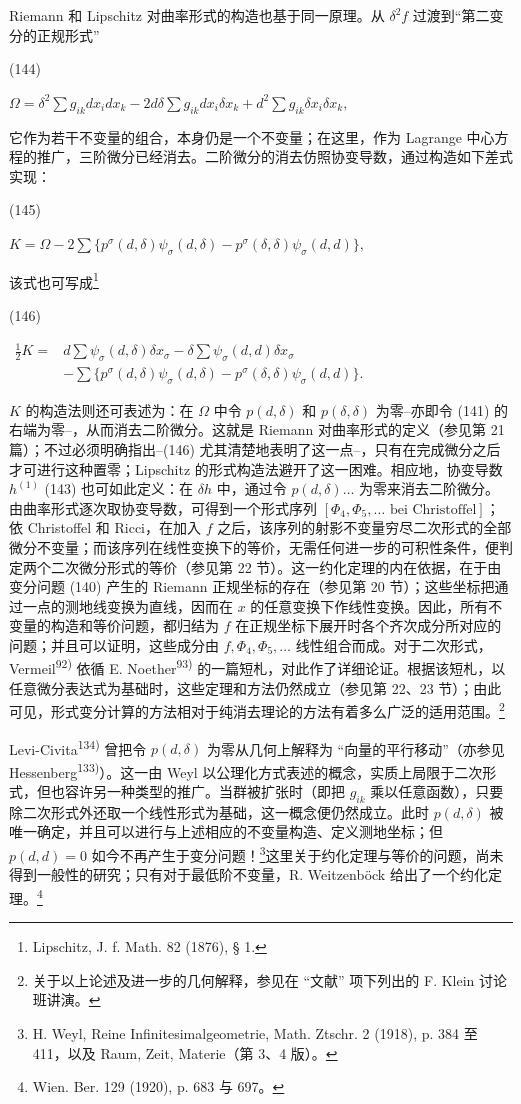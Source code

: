 \documentclass[11pt]{article}
\providecommand{\glqq}{“}
\providecommand{\grqq}{”}
\providecommand{\srcnumdisplay}[3][3.4em]{%
  \par\smallskip\noindent
  \begin{minipage}[t]{#1}\vspace*{0pt}#2\end{minipage}%
  \begin{minipage}[t]{\dimexpr\linewidth-#1\relax}\vspace*{0pt}\centering
  \(\displaystyle #3\)
  \end{minipage}\par\smallskip}
\begin{document}
Riemann 和 Lipschitz 对曲率形式的构造也基于同一原理。从 $\delta^2 f$ 过渡到\glqq{}第二变分的正规形式\grqq{}
\srcnumdisplay{(144)}{\Omega=\delta^2\sum g_{ik}dx_i dx_k
-2d\delta\sum g_{ik}dx_i\delta x_k
+d^2\sum g_{ik}\delta x_i\delta x_k,}
它作为若干不变量的组合，本身仍是一个不变量；在这里，作为 Lagrange 中心方程的推广，三阶微分已经消去。二阶微分的消去仿照协变导数，通过构造如下差式实现：
\srcnumdisplay{(145)}{K=\Omega-2\sum\{p^\sigma(d,\delta)\psi_\sigma(d,\delta)
-p^\sigma(\delta,\delta)\psi_\sigma(d,d)\},}
该式也可写成\footnote{Lipschitz, J. f. Math. 82 (1876), § 1.}
\srcnumdisplay{(146)}{\begin{aligned}
\frac12 K={}&d\sum\psi_\sigma(d,\delta)\delta x_\sigma
-\delta\sum\psi_\sigma(d,d)\delta x_\sigma\\
&-\sum\{p^\sigma(d,\delta)\psi_\sigma(d,\delta)
-p^\sigma(\delta,\delta)\psi_\sigma(d,d)\}.
\end{aligned}}
$K$ 的构造法则还可表述为：在 $\Omega$ 中令 $p(d,\delta)$ 和 $p(\delta,\delta)$ 为零--亦即令 (141) 的右端为零--，从而消去二阶微分。这就是 Riemann 对曲率形式的定义（参见第 21 篇）；不过必须明确指出--(146) 尤其清楚地表明了这一点--，只有在完成微分之后才可进行这种置零；Lipschitz 的形式构造法避开了这一困难。相应地，协变导数 $h^{(1)}$ (143) 也可如此定义：在 $\delta h$ 中，通过令 $p(d,\delta)\ldots$ 为零来消去二阶微分。
由曲率形式逐次取协变导数，可得到一个形式序列 $[\Phi_4,\Phi_5,\ldots\text{ bei Christoffel}]$；依 Christoffel 和 Ricci，在加入 $f$ 之后，该序列的射影不变量穷尽二次形式的全部微分不变量；而该序列在线性变换下的等价，无需任何进一步的可积性条件，便判定两个二次微分形式的等价（参见第 22 节）。这一约化定理的内在依据，在于由变分问题 (140) 产生的 Riemann 正规坐标的存在（参见第 20 节）；这些坐标把通过一点的测地线变换为直线，因而在 $x$ 的任意变换下作线性变换。因此，所有不变量的构造和等价问题，都归结为 $f$ 在正规坐标下展开时各个齐次成分所对应的问题；并且可以证明，这些成分由 $f,\Phi_4,\Phi_5,\ldots$ 线性组合而成。对于二次形式，Vermeil\textsuperscript{92)} 依循 E. Noether\textsuperscript{93)} 的一篇短札，对此作了详细论证。根据该短札，以任意微分表达式为基础时，这些定理和方法仍然成立（参见第 22、23 节）；由此可见，形式变分计算的方法相对于纯消去理论的方法有着多么广泛的适用范围。\footnote{关于以上论述及进一步的几何解释，参见在 \glqq{}文献\grqq{} 项下列出的 F. Klein 讨论班讲演。}

Levi-Civita\textsuperscript{134)} 曾把令 $p(d,\delta)$ 为零从几何上解释为 \glqq{}向量的平行移动\grqq{}（亦参见 Hessenberg\textsuperscript{133)}）。这一由 Weyl 以公理化方式表述的概念，实质上局限于二次形式，但也容许另一种类型的推广。当群被扩张时（即把 $g_{ik}$ 乘以任意函数），只要除二次形式外还取一个线性形式为基础，这一概念便仍然成立。此时 $p(d,\delta)$ 被唯一确定，并且可以进行与上述相应的不变量构造、定义测地坐标；但 $p(d,d)=0$ 如今不再产生于变分问题！\footnote{H. Weyl, Reine Infinitesimalgeometrie, Math. Ztschr. 2 (1918), p. 384 至 411，以及 Raum, Zeit, Materie（第 3、4 版）。}这里关于约化定理与等价的问题，尚未得到一般性的研究；只有对于最低阶不变量，R. Weitzenböck 给出了一个约化定理。\footnote{Wien. Ber. 129 (1920), p. 683 与 697。}
\end{document}
